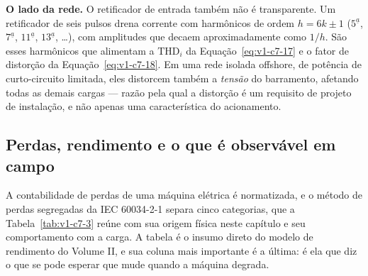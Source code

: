 \documentclass[12pt,a4paper]{article}
\numberwithin{equation}{section}
\numberwithin{table}{section}
\numberwithin{figure}{section}
\begin{document}
\textbf{O lado da rede.} O retificador de entrada também não é transparente. Um
retificador de seis pulsos drena corrente com harmônicos de ordem
$h = 6k\pm1$ ($5^{\underline{a}}$, $7^{\underline{a}}$, $11^{\underline{a}}$,
$13^{\underline{a}}$, \dots), com amplitudes que decaem aproximadamente como
$1/h$. São esses harmônicos que alimentam a $\mathrm{THD}_i$ da
Equação~\eqref{eq:v1-c7-17} e o fator de distorção da
Equação~\eqref{eq:v1-c7-18}. Em uma rede isolada offshore, de potência de
curto-circuito limitada, eles distorcem também a \emph{tensão} do barramento,
afetando todas as demais cargas --- razão pela qual a distorção é um requisito
de projeto de instalação, e não apenas uma característica do acionamento.

\subsection{Perdas, rendimento e o que é observável em
campo}\label{sub:v1-c7-perdas}

A contabilidade de perdas de uma máquina elétrica é normatizada, e o método de
perdas segregadas da IEC 60034-2-1 \cite{iec60034} separa cinco categorias, que
a Tabela~\ref{tab:v1-c7-3} reúne com sua origem física neste capítulo e seu
comportamento com a carga. A tabela é o insumo direto do modelo de rendimento
do Volume II, e sua coluna mais importante é a última: é ela que diz o que se
pode esperar que mude quando a máquina degrada.

\begin{table}[H]
\centering
\caption[Perdas segregadas de máquina de indução]{Categorias de perda da
IEC 60034-2-1, origem física neste capítulo e dependência da carga.}
\label{tab:v1-c7-3}
\small
{}
\end{table}
\end{document}

